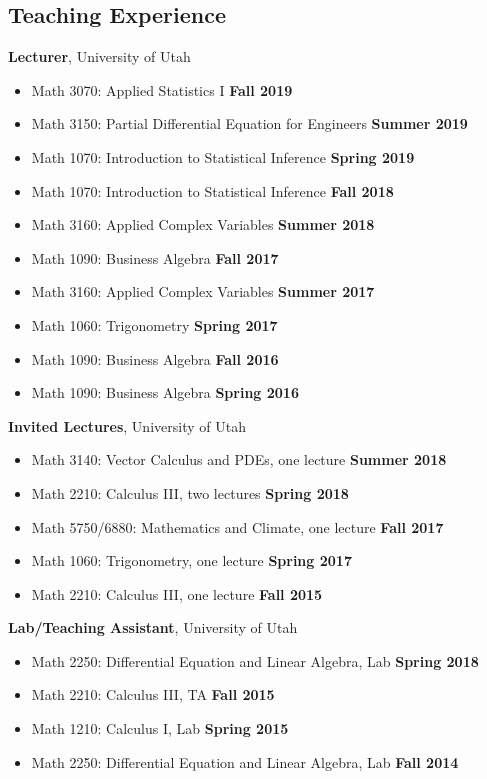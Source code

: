 \documentclass[margin,line]{res}
\begin{document}
\begin{resume}
\section{\sc Teaching Experience}
{\bf Lecturer}, University of Utah
\vspace*{.05in}
\begin{itemize}
\item[ ] Math 3070: Applied Statistics I \hfill {\bf Fall 2019}
\item[ ] Math 3150: Partial Differential Equation for Engineers \hfill {\bf Summer 2019}
\item[ ] Math 1070: Introduction to Statistical Inference \hfill {\bf Spring 2019}
\item[ ] Math 1070: Introduction to Statistical Inference \hfill {\bf Fall 2018}
\item[ ] Math 3160: Applied Complex Variables \hfill {\bf Summer 2018}
\item[ ] Math 1090: Business Algebra \hfill {\bf Fall 2017}
\item[ ] Math 3160: Applied Complex Variables \hfill {\bf Summer 2017}
\item[ ] Math 1060: Trigonometry \hfill {\bf Spring 2017}
\item[ ] Math 1090: Business Algebra \hfill {\bf Fall 2016}
\item[ ] Math 1090: Business Algebra \hfill {\bf Spring 2016}
\end{itemize}
{\bf Invited Lectures}, University of Utah
\vspace*{.05in}
\begin{itemize}
\item[ ] Math 3140: Vector Calculus and PDEs, one lecture \hfill {\bf Summer 2018}
\item[ ] Math 2210: Calculus III, two lectures \hfill {\bf Spring 2018}
\item[ ] Math 5750/6880: Mathematics and Climate, one lecture \hfill {\bf Fall 2017}
\item[ ] Math 1060: Trigonometry, one lecture \hfill {\bf Spring 2017}
\item[ ] Math 2210: Calculus III, one lecture \hfill {\bf Fall 2015}
\end{itemize}
{\bf Lab/Teaching Assistant}, University of Utah
\vspace*{.05in}
\begin{itemize}
\item[ ] Math 2250: Differential Equation and Linear Algebra, Lab \hfill {\bf Spring 2018}
\item[ ] Math 2210: Calculus III, TA \hfill {\bf Fall 2015}
\item[ ] Math 1210: Calculus I, Lab \hfill {\bf Spring 2015}
\item[ ] Math 2250: Differential Equation and Linear Algebra, Lab \hfill {\bf Fall 2014}
\end{itemize}


\end{resume}
\end{document}
